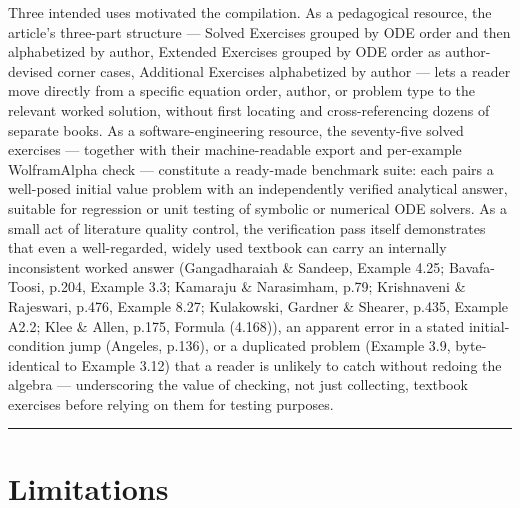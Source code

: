 \documentclass[
  11pt,
]{article}
\begin{document}
Three intended uses motivated the compilation. As a pedagogical
resource, the article's three-part structure --- Solved Exercises
grouped by ODE order and then alphabetized by author, Extended Exercises
grouped by ODE order as author-devised corner cases, Additional
Exercises alphabetized by author --- lets a reader move directly from a
specific equation order, author, or problem type to the relevant worked
solution, without first locating and cross-referencing dozens of
separate books. As a software-engineering resource, the seventy-five
solved exercises --- together with their machine-readable export and
per-example WolframAlpha check --- constitute a ready-made benchmark
suite: each pairs a well-posed initial value problem with an
independently verified analytical answer, suitable for regression or
unit testing of symbolic or numerical ODE solvers. As a small act of
literature quality control, the verification pass itself demonstrates
that even a well-regarded, widely used textbook can carry an internally
inconsistent worked answer (Gangadharaiah \& Sandeep, Example 4.25;
Bavafa-Toosi, p.204, Example 3.3; Kamaraju \& Narasimham, p.79;
Krishnaveni \& Rajeswari, p.476, Example 8.27; Kulakowski, Gardner \&
Shearer, p.435, Example A2.2; Klee \& Allen, p.175, Formula (4.168)), an
apparent error in a stated initial-condition jump (Angeles, p.136), or a
duplicated problem (Example 3.9, byte-identical to Example 3.12) that a
reader is unlikely to catch without redoing the algebra --- underscoring
the value of checking, not just collecting, textbook exercises before
relying on them for testing purposes.

\begin{center}\rule{0.5\linewidth}{0.5pt}\end{center}

\hypertarget{limitations}{%
\section{Limitations}\label{limitations}}
\end{document}

